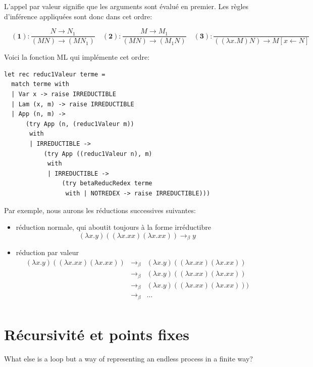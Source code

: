 \documentclass[11pt]{book}
\begin{document}
L'appel par valeur signifie que les arguments sont évalué en premier. Les règles d'inférence appliquées sont donc dans cet ordre:

$$
\quad \mathbf{(1)} : \frac{N \rightarrow N_1}{(M N) \rightarrow (M N_1)}
\quad \mathbf{(2)} : \frac{M \rightarrow M_1}{(M N) \rightarrow (M_1 N)}
\quad \mathbf{(3)} : \frac{}{((\lambda x.M)N) \rightarrow M[x \leftarrow N]} 
$$

Voici la fonction ML qui implémente cet ordre:
\begin{Verbatim}
let rec reduc1Valeur terme =
  match terme with
  | Var x -> raise IRREDUCTIBLE
  | Lam (x, m) -> raise IRREDUCTIBLE
  | App (n, m) ->
      (try App (n, (reduc1Valeur m))
       with
       | IRREDUCTIBLE ->
           (try App ((reduc1Valeur n), m)
            with
            | IRREDUCTIBLE ->
                (try betaReducRedex terme
                 with | NOTREDEX -> raise IRREDUCTIBLE)))
\end{Verbatim}

Par exemple, nous aurons les réductions successives suivantes: 

\begin{itemize}
\item réduction normale, qui aboutit toujours à la forme irréductibre
$$ (\lambda x.y) ((\lambda x.xx) (\lambda x.xx)) \rightarrow_\beta y $$ 

\item réduction par valeur 
$$
\begin{array}{ccc}
 (\lambda x.y)((\lambda x.xx) (\lambda x.xx)) &  \rightarrow_\beta  & (\lambda x.y)((\lambda x.xx) (\lambda x.xx))\\ 
 & \rightarrow_\beta  & (\lambda x.y)((\lambda x.xx) (\lambda x.xx)) \\
 &\rightarrow_\beta  & (\lambda x.y)((\lambda x.xx) (\lambda x.xx))) \\
 & \rightarrow_\beta  & \ldots \\
\end{array}
$$
\end{itemize}

\section{Récursivité et points fixes} 

What else is a loop but a way of representing an endless process in a finite way?
\cite{god}
\end{document}
